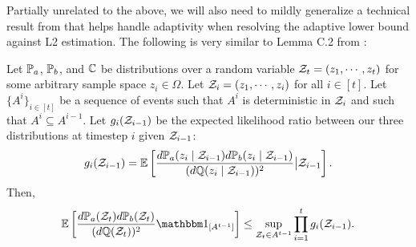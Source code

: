 Partially unrelated to the above, we will also need to mildly generalize a technical result from \cite{simchowitz2017gap} that helps handle adaptivity when resolving the adaptive lower bound against L2 estimation.
The following is very similar to Lemma C.2 from \cite{simchowitz2017gap}:
\begin{lemma}
    \label{lem:unrolling-lemma}
    Let \({\mathbb P}_a\), \({\mathbb P}_b\), and \({\mathbb C}\) be distributions over a random variable \({\mathcal Z}_t = (z_1, \cdots, z_t)\) for some arbitrary sample space \(z_i \in \Omega\).
    Let \({\mathcal Z}_i = (z_1, \cdots, z_i)\) for all \(i\in[t]\).
    Let \(\{A^i\}_{i\in[t]}\) be a sequence of events such that \(A^i\) is deterministic in \({\mathcal Z}_{i}\) and such that \(A^i \subseteq A^{i-1}\).
    Let \(g_i({\mathcal Z}_{i-1})\) be the expected likelihood ratio between our three distributions at timestep \(i\) given \({\mathcal Z}_{i-1}\):
    \[
        g_i({\mathcal Z}_{i-1}) = \operatorname*{\mathbb{E}}\left[
            \frac{d{\mathbb P}_a(z_i \mid {\mathcal Z}_{i-1}) d{\mathbb P}_b(z_i \mid {\mathcal Z}_{i-1})}{(d{\mathbb Q}(z_i \mid {\mathcal Z}_{i-1}))^2} \big| {\mathcal Z}_{i-1}
        \right].
    \]
    Then,
    \[
        \E\left[
            \frac{d\bbP_a(\cZ_t) d\bbP_b(\cZ_t)}{(d\bbQ(\cZ_t))^2}
            \mathbbm1_{[A^{t-1}]}
        \right]
        \leq
        \sup_{\cZ_t\in A^{t-1}}
        \prod_{i=1}^t
        g_i(\cZ_{i-1}).
    \]
\end{lemma}
